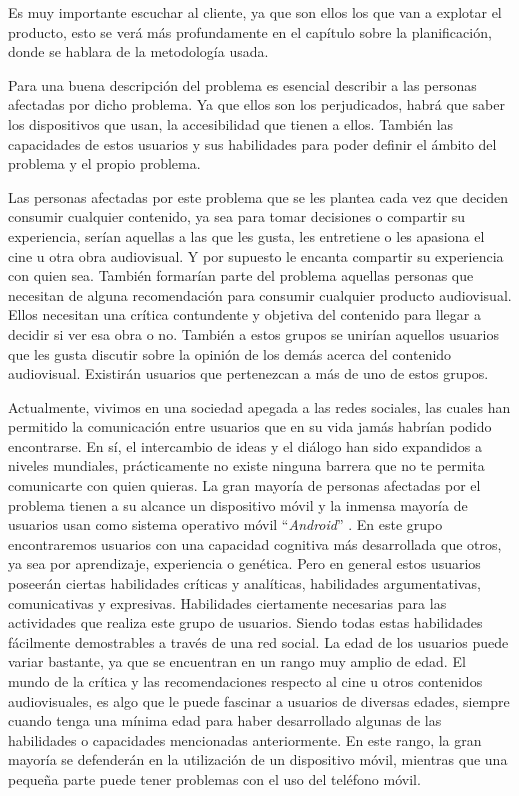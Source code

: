 Es muy importante escuchar al cliente, ya que son ellos los que van a explotar el producto, esto se 
verá más profundamente en el capítulo sobre la planificación, donde se hablara de la metodología usada.

Para una buena descripción del problema es esencial describir a las personas afectadas por dicho 
problema. Ya que ellos son los perjudicados, habrá que saber los dispositivos que usan, la 
accesibilidad que tienen a ellos. También las capacidades de estos usuarios y sus habilidades para 
poder definir el ámbito del problema y el propio problema.

Las personas afectadas por este problema que se les plantea cada vez que deciden consumir cualquier
contenido, ya sea para tomar decisiones o compartir su experiencia, serían aquellas a las que les 
gusta, les entretiene o les apasiona el cine u otra obra audiovisual. Y por supuesto le encanta 
compartir su experiencia con quien sea. También formarían parte del problema aquellas personas que 
necesitan de alguna recomendación para consumir cualquier producto audiovisual. Ellos necesitan una 
crítica contundente y objetiva del contenido para llegar a decidir si ver esa obra o no. También a 
estos grupos se unirían aquellos usuarios que les gusta discutir sobre la opinión de los demás acerca 
del contenido audiovisual. Existirán usuarios que pertenezcan a más de uno de estos grupos.

Actualmente, vivimos en una sociedad apegada a las redes sociales, las cuales han permitido la 
comunicación entre usuarios que en su vida jamás habrían podido encontrarse. En sí, el intercambio de 
ideas y el diálogo han sido expandidos a niveles mundiales, prácticamente no existe ninguna barrera
que no te permita comunicarte con quien quieras. La gran mayoría de personas afectadas por el problema 
tienen a su alcance un dispositivo móvil y la inmensa mayoría de usuarios usan como sistema operativo 
móvil ``\textit{Android}'' \cite{AndrvsIOS}. En este grupo encontraremos usuarios con una capacidad 
cognitiva más desarrollada que otros, ya sea por aprendizaje, experiencia o genética. Pero en general 
estos usuarios poseerán ciertas habilidades críticas y analíticas, habilidades argumentativas, 
comunicativas y expresivas. Habilidades ciertamente necesarias para las actividades que realiza este 
grupo de usuarios. Siendo todas estas habilidades fácilmente demostrables a través de  una red social. 
La edad de los usuarios puede variar bastante, ya que se encuentran en un rango muy amplio de edad. El 
mundo de la crítica y las recomendaciones respecto al cine u otros contenidos audiovisuales, es algo 
que le puede fascinar a usuarios de diversas edades, siempre cuando tenga una mínima 
edad para haber desarrollado algunas de las habilidades o capacidades mencionadas anteriormente. En
este rango, la gran mayoría se defenderán en la utilización de un dispositivo móvil, mientras que una 
pequeña parte puede tener problemas con el uso del teléfono móvil.

